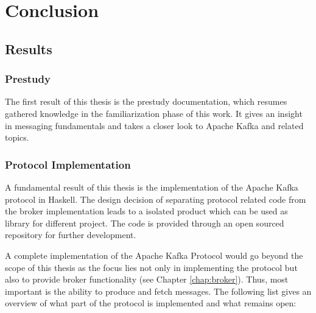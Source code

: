 \chapter{Conclusion}
\section{Results}
\subsection{Prestudy}
The first result of this thesis is the prestudy documentation, which
resumes gathered knowledge in the familiarization phase of this work.
It gives an insight in messaging fundamentals and  takes a closer look to Apache
Kafka and related topics.

\subsection{Protocol Implementation}
A fundamental result of this thesis is the implementation of the Apache Kafka
protocol in Haskell. The design decision of separating protocol related code
from the broker implementation leads to a isolated product which can be used as
library for different project. The code is provided through an open sourced
repository for further development. 

A complete implementation of the Apache Kafka Protocol would go beyond the scope
of this thesis as the focus lies not only in implementing the protocol but also
to provide broker functionality (see Chapter \ref{chap:broker}). Thus, most
important is the ability to produce and fetch messages. The following list gives
an overview of what part of the protocol is implemented and what remains open:

